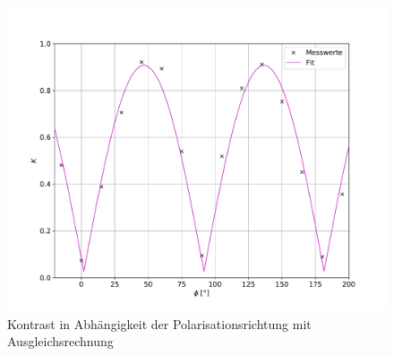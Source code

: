 \begin{figure}[H]
  \centering
  \includegraphics[width=\textwidth]{kontrast.pdf}
  \caption{Kontrast in Abhängigkeit der Polarisationsrichtung mit
  Ausgleichsrechnung}
  \label{fig:kontrast}
\end{figure}
